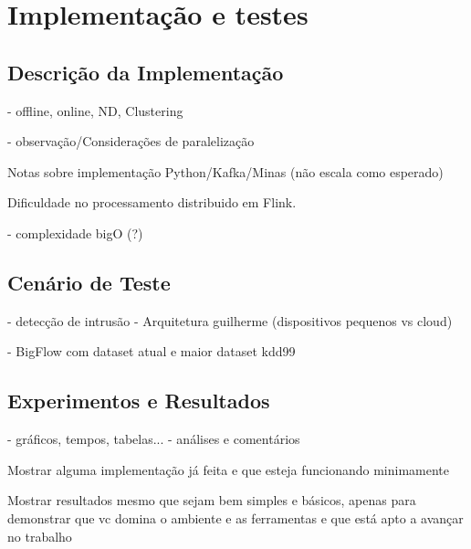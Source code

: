\chapter{Implementação e testes}


\section{Descrição da Implementação}

- offline, online, ND, Clustering

- observação/Considerações de paralelização

Notas sobre implementação Python/Kafka/Minas (não escala como esperado)

Dificuldade no processamento distribuido em Flink.

- complexidade bigO (?)

\section{Cenário de Teste}

- detecção de intrusão
- Arquitetura guilherme (dispositivos pequenos vs cloud)
\cite{Cassales2019a}

- BigFlow com dataset atual e maior
dataset kdd99

\section{Experimentos e Resultados}
    - gráficos, tempos, tabelas...
    - análises e comentários

Mostrar alguma implementação já feita e que esteja funcionando minimamente

Mostrar resultados mesmo que sejam bem simples e básicos,
apenas para demonstrar que vc domina o ambiente e as ferramentas e
que está apto a avançar no trabalho 


